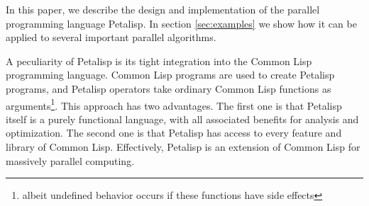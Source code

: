 In this paper, we describe the design and implementation of the parallel
programming language Petalisp. In section \ref{sec:examples} we show how it
can be applied to several important parallel algorithms.

A peculiarity of Petalisp is its tight integration into the Common Lisp
programming language. Common Lisp programs are used to create Petalisp
programs, and Petalisp operators take ordinary Common Lisp functions as
arguments\footnote{albeit undefined behavior occurs if these functions have
  side effects}. This approach has two advantages. The first one is that
Petalisp itself is a purely functional language, with all associated
benefits for analysis and optimization. The second one is that Petalisp has
access to every feature and library of Common Lisp. Effectively, Petalisp
is an extension of Common Lisp for massively parallel computing.
